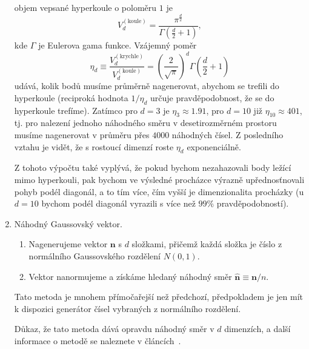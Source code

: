 \documentclass[a4paper,11pt,twoside]{article}
\def\vector#1{\boldsymbol{#1}}								%
\begin{document}
\begin{solution}
\begin{enumerate}
                objem vepsané hyperkoule o poloměru $1$ je
                \begin{equation}
                    V_{d}^{(\text{koule})}=\frac{\pi^{\frac{d}{2}}}{\Gamma\left(\frac{d}{2}+1\right)},
                \end{equation}
                kde $\Gamma$ je Eulerova gama funkce.
                Vzájemný poměr
                \begin{equation}
                    \eta_{d}\equiv\frac{V_{d}^{(\text{krychle})}}{V_{d}^{(\text{koule})}}=\left(\frac{2}{\sqrt{\pi}}\right)^{d}\Gamma\left(\frac{d}{2}+1\right)
                \end{equation}
                udává, kolik bodů musíme průměrně nagenerovat, abychom se trefili do hyperkoule (reciproká hodnota $1/\eta_{d}$ určuje pravděpodobnost, že se do hyperkoule trefíme).
                Zatímco pro $d=3$ je $\eta_{3}\approx1.91$, pro $d=10$ již $\eta_{10}\approx401$, tj. pro nalezení jednoho náhodného směru v desetirozměrném prostoru musíme nagenerovat v průměru přes $4000$ náhodných čísel.
                Z posledního vztahu je vidět, že s rostoucí dimenzí roste $\eta_{d}$ exponenciálně.

                Z tohoto výpočtu také vyplývá, že pokud bychom nezahazovali body ležící mimo hyperkouli, pak bychom ve výsledné procházce výrazně upřednosťnovali pohyb podél diagonál, a to tím více, čím vyšší je dimenzionalita procházky (u $d=10$ bychom podél diagonál vyrazili s více než $99\%$ pravděpodobností).
                
            \item Náhodný Gaussovský vektor.
                \begin{enumerate}
                    \item Nagenerujeme vektor $\vector{n}$ s $d$ složkami, přičemž každá složka je číslo z normálního Gaussovského rozdělení $N(0,1)$.
                    \item Vektor nanormujeme a získáme hledaný náhodný směr $\vector{\hat{n}}\equiv\vector{n}/n$. 
                \end{enumerate}
                Tato metoda je mnohem přímočařejší než předchozí, předpokladem je jen mít k dispozici generátor čísel vybraných z normálního rozdělení.

                Důkaz, že tato metoda dává opravdu náhodný směr v $d$ dimenzích, a další informace o metodě se naleznete v článcích~\cite{Mul59,Mar72}.


\end{enumerate}
\end{solution}
\end{document}
